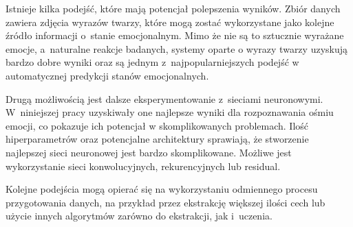 Istnieje kilka podejść, które mają potencjał polepszenia wyników.
Zbiór danych zawiera zdjęcia wyrazów twarzy, które mogą zostać wykorzystane jako kolejne źródło informacji o~stanie emocjonalnym.
Mimo że nie są to sztucznie wyrażane emocje, a~naturalne reakcje badanych, systemy oparte o wyrazy twarzy uzyskują bardzo dobre wyniki oraz są jednym z~najpopularniejszych podejść w automatycznej predykcji stanów emocjonalnych.

Drugą możliwością jest dalsze eksperymentowanie z~sieciami neuronowymi.
W~niniejszej pracy uzyskiwały one najlepsze wyniki dla rozpoznawania ośmiu emocji, co pokazuje ich potencjał w skomplikowanych problemach.
Ilość hiperparametrów oraz potencjalne architektury sprawiają, że stworzenie najlepszej sieci neuronowej jest bardzo skomplikowane.
Możliwe jest wykorzystanie sieci konwolucyjnych, rekurencyjnych lub residual.

Kolejne podejścia mogą opierać się na wykorzystaniu odmiennego procesu przygotowania danych, na przykład przez ekstrakcję większej ilości cech lub użycie innych algorytmów zarówno do ekstrakcji, jak i~uczenia.
